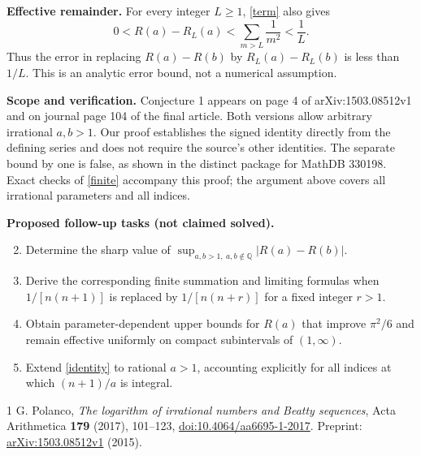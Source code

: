 \documentclass[11pt]{article}
\begin{document}
\noindent\textbf{Effective remainder.}
For every integer $L\ge1$, \eqref{term} also gives
\[
 0<R(a)-R_L(a)<\sum_{m>L}\frac1{m^2}<\frac1L.
\]
Thus the error in replacing $R(a)-R(b)$ by $R_L(a)-R_L(b)$ is
less than $1/L$. This is an analytic error bound, not a numerical
assumption.

\medskip
\noindent\textbf{Scope and verification.}
Conjecture 1 appears on page 4 of arXiv:1503.08512v1 and on journal
page 104 of the final article. Both versions allow arbitrary irrational
$a,b>1$. Our proof establishes the signed identity directly from the
defining series and does not require the source's other identities.
The separate bound by one is false, as shown in the distinct package
for MathDB 330198. Exact checks of \eqref{finite} accompany this proof;
the argument above covers all irrational parameters and all indices.

\medskip
\noindent\textbf{Proposed follow-up tasks (not claimed solved).}
\begin{enumerate}
\setcounter{enumi}{1}
\item Determine the sharp value of
$\sup_{a,b>1,\ a,b\notin\mathbb Q}|R(a)-R(b)|$.
\item Derive the corresponding finite summation and limiting formulas
when $1/[n(n+1)]$ is replaced by $1/[n(n+r)]$ for a fixed integer $r>1$.
\item Obtain parameter-dependent upper bounds for $R(a)$ that improve
$\pi^2/6$ and remain effective uniformly on compact subintervals of $(1,\infty)$.
\item Extend \eqref{identity} to rational $a>1$, accounting explicitly
for all indices at which $(n+1)/a$ is integral.
\end{enumerate}

\begin{thebibliography}{1}
 G. Polanco, \emph{The logarithm of irrational numbers
and Beatty sequences}, Acta Arithmetica \textbf{179} (2017), 101--123,
\href{https://doi.org/10.4064/aa6695-1-2017}{doi:10.4064/aa6695-1-2017}.
Preprint: \href{https://arxiv.org/abs/1503.08512}{arXiv:1503.08512v1} (2015).
\end{thebibliography}
\end{document}
